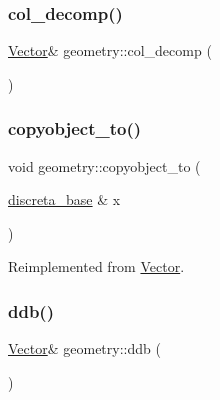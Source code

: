 \mbox{\label{classgeometry_a12425a7d0cebea16e0d22c44e7fbe555}} 
\subsubsection{\texorpdfstring{col\+\_\+decomp()}{col\_decomp()}}
{\footnotesize\ttfamily \mbox{\hyperlink{class_vector}{Vector}}\& geometry\+::col\+\_\+decomp (\begin{DoxyParamCaption}{ }\end{DoxyParamCaption})\hspace{0.3cm}{\ttfamily [inline]}}

\mbox{\label{classgeometry_a3c35255b73911b76347ae549edfb0050}} 
\subsubsection{\texorpdfstring{copyobject\+\_\+to()}{copyobject\_to()}}
{\footnotesize\ttfamily void geometry\+::copyobject\+\_\+to (\begin{DoxyParamCaption}\item[{\mbox{\hyperlink{classdiscreta__base}{discreta\+\_\+base}} \&}]{x }\end{DoxyParamCaption})\hspace{0.3cm}{\ttfamily [virtual]}}



Reimplemented from \mbox{\hyperlink{class_vector_af657307f3d344c8cef5d633335a5f484}{Vector}}.

\mbox{\label{classgeometry_a7a47161530f508d7aeb853a090a6eef8}} 
\subsubsection{\texorpdfstring{ddb()}{ddb()}}
{\footnotesize\ttfamily \mbox{\hyperlink{class_vector}{Vector}}\& geometry\+::ddb (\begin{DoxyParamCaption}{ }\end{DoxyParamCaption})\hspace{0.3cm}{\ttfamily [inline]}}


